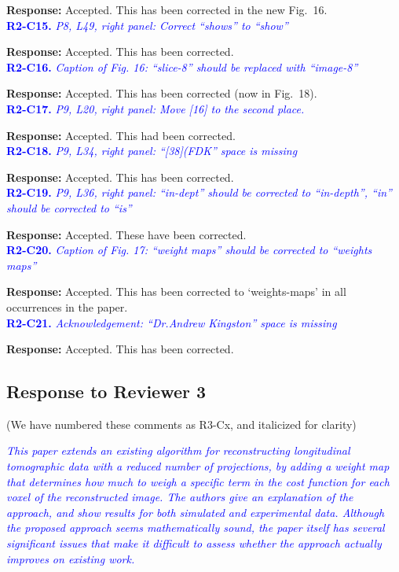 \documentclass{article}
\begin{document}
  \textbf{Response:} Accepted. This has been corrected in the new Fig.~16.\\

 \textcolor{blue}{\textbf{R2-C15.}\textit{ P8, L49, right panel: Correct ``shows'' to ``show''}}
 
 \textbf{Response:} Accepted. This has been corrected.\\

 \textcolor{blue}{\textbf{R2-C16.}\textit{ Caption of Fig. 16: ``slice-8'' should be replaced with ``image-8''}}
 
 \textbf{Response:} Accepted. This has been corrected (now in Fig.~18).\\

 \textcolor{blue}{\textbf{R2-C17.}\textit{ P9, L20, right panel: Move [16] to the second place.   }}
 
 \textbf{Response:} Accepted. This had been corrected.\\

\textcolor{blue}{\textbf{R2-C18.}\textit{ P9, L34, right panel: ``[38](FDK'' space is missing}}
 
 \textbf{Response:} Accepted. This has been corrected.\\

 \textcolor{blue}{\textbf{R2-C19.}\textit{ P9, L36, right panel: ``in-dept'' should be corrected to ``in-depth'', ``in'' should be corrected to ``is''}}
 
 \textbf{Response:} Accepted. These have been corrected.\\

 \textcolor{blue}{\textbf{R2-C20.}\textit{ Caption of Fig. 17: ``weight maps'' should be corrected to ``weights maps''}}
 
\textbf{Response:} Accepted. This has been corrected to `weights-maps' in all occurrences in the paper.\\

 \textcolor{blue}{\textbf{R2-C21.}\textit{ Acknowledgement: ``Dr.Andrew Kingston'' space is missing}}
 
\textbf{Response:} Accepted. This has been corrected.      

\subsection{Response to Reviewer 3}
(We have numbered these comments as R3-Cx, and italicized for clarity)

\textcolor{blue}{\textit{This paper extends an existing algorithm for reconstructing longitudinal tomographic data with a reduced number of projections, by adding a weight map that determines how much to weigh a specific term in the cost function for each voxel of the reconstructed image. The authors give an explanation of the approach, and show results for both simulated and experimental data. Although the proposed approach seems mathematically sound, the paper itself has several significant issues that make it difficult to assess whether the approach actually improves on existing work. }}\\
\end{document}
